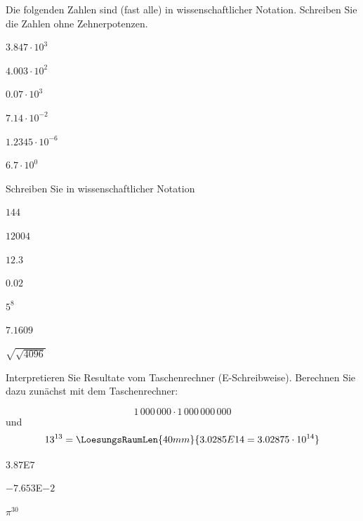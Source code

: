 \platzFuerBerechnungenBisEndeSeite{}
\TRAINER{\newpage}

Die folgenden Zahlen sind (fast alle) in wissenschaftlicher Notation. Schreiben
Sie die Zahlen ohne Zehnerpotenzen.

\begin{bbwAufgabenBlock}
\item $3.847 \cdot{} 10^3$ 
\item $4.003\cdot{} 10^2$ 
\item $0.07\cdot{}10^3$ 
\item $7.14\cdot{}10^{-2}$
\item $1.2345\cdot{}10^{-6}$ 
\item $6.7\cdot{}10^0$ 
\end{bbwAufgabenBlock}

\platzFuerBerechnungenBisEndeSeite{}


Schreiben Sie in wissenschaftlicher Notation

\begin{bbwAufgabenBlock}
\item $144$ 
\item $12004$ 
\item $12.3$ 
\item $0.02$ 
\item $5^8$ 
\item $7.1609$ 
\item $\sqrt{\sqrt{4096}}$ 
\end{bbwAufgabenBlock}

\platzFuerBerechnungenBisEndeSeite{}

Interpretieren Sie Resultate vom Taschenrechner ({\scriptsize{E}}-Schreibweise). Berechnen Sie dazu zunächst mit dem Taschenrechner:

$$1\,000\,000 \cdot{} 1\,000\,000\,000$$
und
$$13^{13} = \LoesungsRaumLen{40mm}{3.0285 E 14 = 3.02875 \cdot{} 10^{14}}$$

\begin{bbwAufgabenBlock}
\item $3.87${\scriptsize{E}}$7$ 
\item $-7.653${\scriptsize{E}}$-2$ 
\item $\pi^{30}$ 
\end{bbwAufgabenBlock}


